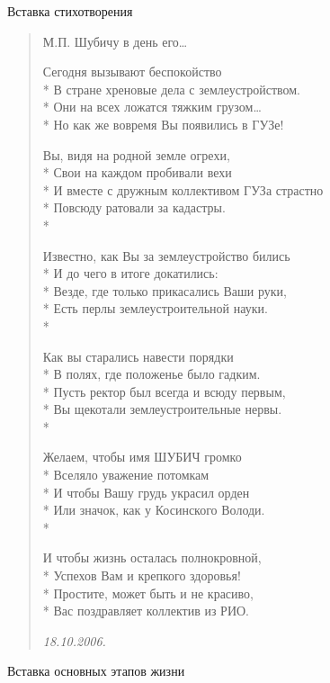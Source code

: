 Вставка стихотворения

\begin{verse}
М.П. Шубичу
в день его…

Сегодня вызывают беспокойство\\*
В стране хреновые дела с землеустройством.\\*
Они на всех ложатся тяжким грузом…\\* 
Но как же вовремя Вы появились в ГУЗе!

Вы, видя на родной земле огрехи,\\*
Свои на каждом пробивали вехи \\*
И вместе с дружным коллективом ГУЗа страстно \\*
Повсюду ратовали за кадастры.\\*

Известно, как Вы за землеустройство бились \\*
И до чего в итоге докатились:\\*
Везде, где только прикасались Ваши руки,\\*
Есть перлы землеустроительной науки.\\*

Как вы старались навести порядки \\*
В полях, где положенье было гадким.\\*
Пусть ректор был всегда и всюду первым,\\*
Вы щекотали землеустроительные нервы.\\*

Желаем, чтобы имя ШУБИЧ громко \\*
Вселяло уважение потомкам \\*
И чтобы Вашу грудь украсил орден \\*
Или значок, как у Косинского Володи.\\*

И чтобы жизнь осталась полнокровной,\\*
Успехов Вам и крепкого здоровья!\\*
Простите, может быть и не красиво,\\*
Вас поздравляет коллектив из РИО.

\textit{18.10.2006.}
\end{verse}


Вставка основных этапов жизни


